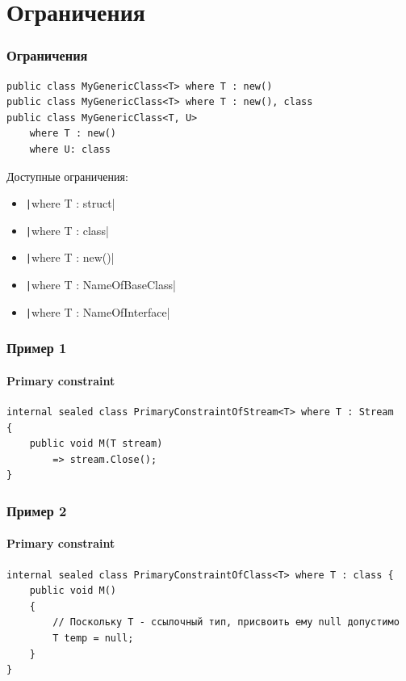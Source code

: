 \documentclass{../../slides-style}
\begin{document}
    \section{Ограничения}
    
    \begin{frame}[fragile]
        \frametitle{Ограничения}
        \begin{verbatim}
public class MyGenericClass<T> where T : new()
public class MyGenericClass<T> where T : new(), class
public class MyGenericClass<T, U> 
    where T : new() 
    where U: class
        \end{verbatim}

        Доступные ограничения:
        \begin{itemize}
            \item \texttt|where T : struct|
            \item \texttt|where T : class|
            \item \texttt|where T : new()|
            \item \texttt|where T : NameOfBaseClass|
            \item \texttt|where T : NameOfInterface|
        \end{itemize}
    \end{frame}

    \begin{frame}[fragile]
        \frametitle{Пример 1}
        \framesubtitle{Primary constraint}
        \begin{footnotesize}
            \begin{verbatim}
internal sealed class PrimaryConstraintOfStream<T> where T : Stream 
{
    public void M(T stream) 
        => stream.Close();
}
            \end{verbatim}
        \end{footnotesize}
    \end{frame}

    \begin{frame}[fragile]
        \frametitle{Пример 2}
        \framesubtitle{Primary constraint}
        \begin{footnotesize}
            \begin{verbatim}
internal sealed class PrimaryConstraintOfClass<T> where T : class {
    public void M() 
    {
        // Поскольку T - ссылочный тип, присвоить ему null допустимо
        T temp = null;
    }
}
            \end{verbatim}
        \end{footnotesize}
    \end{frame}
\end{document}
